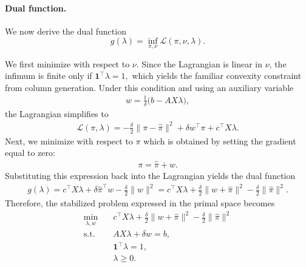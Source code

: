 \documentclass{book}
\theoremstyle{definition}
\numberwithin{algorithm_}{chapter}
\begin{document}
\medskip

\paragraph{Dual function.}

We now derive the dual function
\[
g(\lambda)
=
\inf_{\pi,\nu}
\mathcal{L}(\pi,\nu,\lambda).
\]

We first minimize with respect to $\nu$. Since the Lagrangian is linear in $\nu$, the infimum is finite only if
$\mathbf{1}^\top \lambda = 1,$
which yields the familiar convexity constraint from column generation. Under this condition and using an auxiliary variable
\begin{align} \label{eq:w-substitution}
w
=
\frac{1}{\delta}
\big(
b - A X \lambda
\big),
\end{align}
the Lagrangian simplifies to
\begin{align}
\mathcal{L}(\pi,\lambda)
=
-
\frac{\delta}{2}\|\pi - \hat{\pi}\|^2
+
\delta w^\top \pi
+
c^\top X \lambda.
\end{align}
Next, we minimize with respect to $\pi$ which is obtained by setting the gradient equal to zero:
\begin{align} \label{eq:expression_pi}
\pi
=
\hat{\pi}
+
w.
\end{align}
Substituting this expression back into the Lagrangian yields the dual function
\begin{align}
g(\lambda) 
= c^\top X \lambda + \delta \hat{\pi}^\top w - \frac{\delta}{2} \| w \|^2 
= c^\top X \lambda + \frac{\delta}{2} \| w + \hat{\pi} \|^2 - \frac{\delta}{2} \| \hat{\pi} \|^2 .
\end{align}
Therefore, the stabilized problem expressed in the primal space becomes
\begin{subequations}
\label{eq:stabilized_primal}
\begin{align}
\min_{\lambda, w}
\quad
&
c^\top X \lambda
+
\frac{\delta}{2} \| w + \hat{\pi} \|^2
-
\frac{\delta}{2} \| \hat{\pi} \|^2
\label{eq:stabilized_primal_obj}
\\
\text{s.t.}
\quad
&
A X \lambda + \delta w = b,
\label{eq:stabilized_primal_link}
\\
&
\mathbf{1}^\top \lambda = 1,
\label{eq:stabilized_primal_convexity}
\\
&
\lambda \ge 0.
\label{eq:stabilized_primal_nonneg}
\end{align}
\end{subequations}
\end{document}
